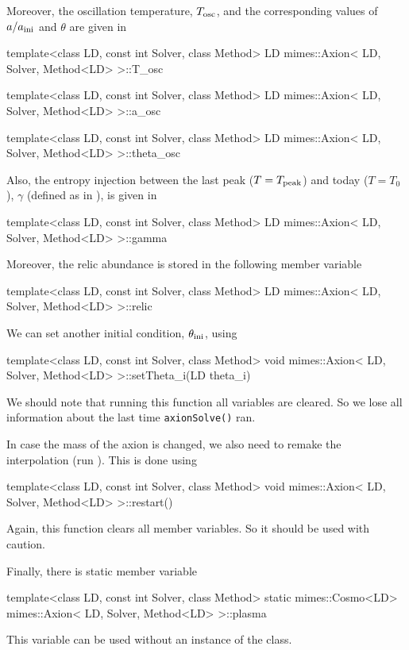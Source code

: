 \documentclass[11pt,a4paper]{article}
\begin{document}
Moreover, the oscillation temperature, $T_{\rm osc}{}$, and the corresponding values of $a/a_{\rm ini}{}$ and $\theta$ are given in
%
\begin{cpp}
	template<class LD, const int Solver, class Method>
	LD mimes::Axion< LD, Solver, Method<LD> >::T_osc
	
	template<class LD, const int Solver, class Method>
	LD mimes::Axion< LD, Solver, Method<LD> >::a_osc

	template<class LD, const int Solver, class Method>
	LD mimes::Axion< LD, Solver, Method<LD> >::theta_osc
\end{cpp}
%

Also, the entropy injection between the last peak ($T=T_{\rm peak}$) and today ($T=T_0$), $\gamma$ (defined as in ), is given in 
%
\begin{cpp}
	template<class LD, const int Solver, class Method>
	LD mimes::Axion< LD, Solver, Method<LD> >::gamma
\end{cpp}

Moreover, the relic abundance is stored in the following member variable 
%
\begin{cpp}
	template<class LD, const int Solver, class Method>
	LD mimes::Axion< LD, Solver, Method<LD> >::relic
\end{cpp}



We can set another initial condition, $\theta_{\rm ini}{}$, using 
%
\begin{cpp}
	template<class LD, const int Solver, class Method>
	void mimes::Axion< LD, Solver, Method<LD> >::setTheta_i(LD theta_i)
\end{cpp}
%
We should note that running this function all variables are cleared. So we lose all information about the last time {\tt axionSolve()} ran. 

In case the mass of the axion is changed, we also need to remake  the interpolation (\ie run ). This is done using
%
\begin{cpp}
	template<class LD, const int Solver, class Method>
	void mimes::Axion< LD, Solver, Method<LD> >::restart()
\end{cpp}
%
Again, this function clears all member variables. So it should be used with caution.


Finally, there is static  member variable
%
\begin{cpp}
	template<class LD, const int Solver, class Method>
	static mimes::Cosmo<LD> mimes::Axion< LD, Solver, Method<LD> >::plasma
\end{cpp}
%
This variable can be used without an instance of the  class.
\end{document}
